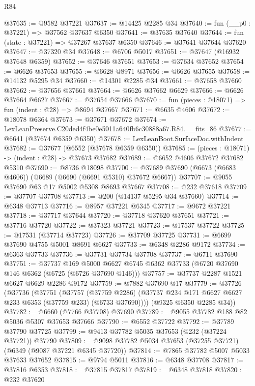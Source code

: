 \begin{lexlean}{R84}
\begin{coremodule}
@37635 := @9582 @37221
@37637 := @14425 @2285 @34
@37640 := fun (__p0 : @37221) => @37562 @37637 @6350
@37641 := @37635 @37640
@37644 := fun (state : @37221) => @37267 @37637 @6350
@37646 := @37641 @37644 @37620
@37647 := @37320 @34
@37648 := @6706 @5017
@37651 := @37647 (@16932 @37648 @6359)
@37652 := @37646 @37651
@37653 := @37634 @37652
@37654 := @6626 @37653
@37655 := @6628 @8971
@37656 := @6626 @37655
@37658 := @14132 @5295 @34
@37660 := @14301 @2285 @34
@37661 := @37658 @37660
@37662 := @37656 @37661
@37664 := @6626 @37662 @6629
@37666 := @6626 @37664 @6627
@37667 := @37654 @37666
@37670 := fun (pieces : @18071) => fun (indent : @28) => @8694 @37667
@37671 := @6635 @4606
@37672 := @18078 @6364
@37673 := @37671 @37672
@37674 := LexLeanPreserve.C20ded4f4be0e5011a640fb6c30888a67.R84.__fits_86
@37677 := @6641 (@37674 @6359 @6350)
@37678 := LexLeanBoot.SurfaceDoc.withIndent
@37682 := @37677 (@6552 (@37678 @6359 @6350))
@37685 := (pieces : @18071) -> (indent : @28) -> @37673 @37682
@37689 := @6652 @4606 @37672 @37682 @5310
@37690 := @8736 @18098
@37700 := @37689 @37690 (@6673 (@6683 @4606)) (@6689 (@6690 (@6691 @5310) @37672 @6667))
@37707 := @9055 @37690 @63 @17 @5002 @5308 @8693 @37667
@37708 := @232 @37618
@37709 := @37707 @37708
@37713 := @200 (@14137 @5295 @34 @37660)
@37714 := @6348 @37713
@37716 := @8957 @37221 @6345
@37717 := @9672 @37221
@37718 := @37717 @37644
@37720 := @37718 @37620 @37651
@37721 := @37716 @37720
@37722 := @37323 @37721
@37723 := @17537 @37722
@37725 := @17531 (@37714 @37723)
@37726 := @37709 @37725
@37731 := @6699 @37690 @4755 @5001 @8691 @6627
@37733 := @6348 @2286 @9172
@37734 := @6363 @37733
@37736 := @37731 @37734 @37708
@37737 := @6711 @37690
@37751 := @37737
    @169
    @5000
    @6627
    @6745
    @6362
    @37733
    (@6720 @37690 @146 @6362 (@6725 (@6726 @37690 @146)))
@37757 := @37737 @2287 @1521 @6627 @6629 @2286 @9172
@37759 := @7882 @37690 @17
@37779 := @37726
    (@37736
      (@37751
        (@37757
          (@37759 @2286)
          (@37737 @234 @171 @6627 @6627 @233 @6353 (@37759 @233) (@6733 @37690))))
      (@9325 @6350 @2285 @34))
@37782 := @6660 (@7766 @37708) @37690
@37789 := @9055 @37782 @188 @82 @5036 @5307 @37653 @37666
@37790 := @6552 @37722
@37792 := @37789 @37790 @37725
@37799 := @9413 @37782 @5035 @37653 (@232 (@37224 @37721)) @37790
@37809 := @9098 @37782 @5034 @37653 (@37255 @37721) (@6349 (@9087 @37221 @6345 @37720))
@37814 := @7865 @37782 @5007 @5033 @37633 @37652
@37815 := @9794 @5011
@37816 := @6348 @37708
@37817 := @37816 @6353
@37818 := @37815 @37817
@37819 := @6348 @37818
@37820 := @232 @37620

\end{coremodule}
\end{lexlean}
